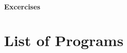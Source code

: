 \documentclass[12pt]{article}
\begin{document}
\paragraph{Excercises}






\section{List of Programs}










\end{document}
